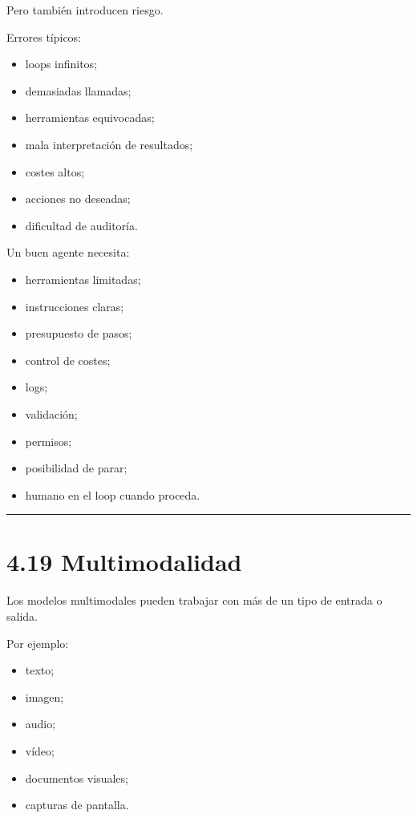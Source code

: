 Pero también introducen riesgo.

Errores típicos:

\begin{itemize}
\tightlist
\item
  loops infinitos;
\item
  demasiadas llamadas;
\item
  herramientas equivocadas;
\item
  mala interpretación de resultados;
\item
  costes altos;
\item
  acciones no deseadas;
\item
  dificultad de auditoría.
\end{itemize}

Un buen agente necesita:

\begin{itemize}
\tightlist
\item
  herramientas limitadas;
\item
  instrucciones claras;
\item
  presupuesto de pasos;
\item
  control de costes;
\item
  logs;
\item
  validación;
\item
  permisos;
\item
  posibilidad de parar;
\item
  humano en el loop cuando proceda.
\end{itemize}

\begin{center}\rule{0.5\linewidth}{0.5pt}\end{center}

\section{4.19 Multimodalidad}\label{multimodalidad}

Los modelos multimodales pueden trabajar con más de un tipo de entrada o
salida.

Por ejemplo:

\begin{itemize}
\tightlist
\item
  texto;
\item
  imagen;
\item
  audio;
\item
  vídeo;
\item
  documentos visuales;
\item
  capturas de pantalla.
\end{itemize}

